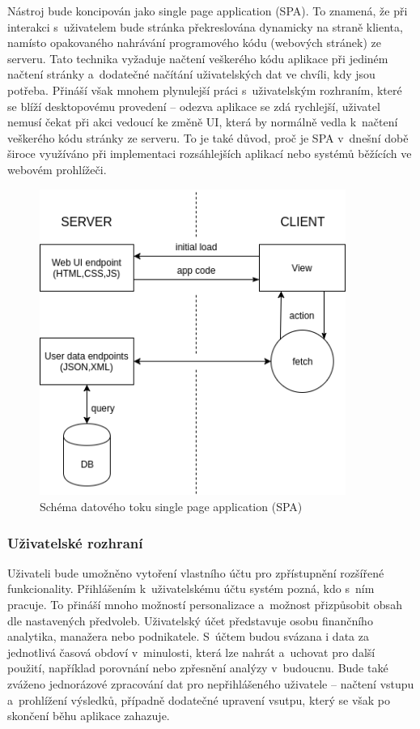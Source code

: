 Nástroj bude koncipován jako single page application (SPA). To znamená, že při interakci s~uživatelem bude stránka překreslována dynamicky na straně klienta, namísto opakovaného nahrávání programového kódu (webových stránek) ze serveru. Tato technika vyžaduje načtení veškerého kódu aplikace při jediném načtení stránky a~dodatečné načítání uživatelských dat ve chvíli, kdy jsou potřeba. Přináší však mnohem plynulejší práci s~uživatelským rozhraním, které se blíží desktopovému provedení -- odezva aplikace se zdá rychlejší, uživatel nemusí čekat při akci vedoucí ke změně UI, která by normálně vedla k~načtení veškerého kódu stránky ze serveru. To je také důvod, proč je SPA v~dnešní době široce využíváno při implementaci rozsáhlejších aplikací nebo systémů běžících ve webovém prohlížeči. 


\begin{figure}
  \centering
  \includegraphics[width=10cm]{img/spa.png}
  \caption{Schéma datového toku single page application (SPA)}
\end{figure}

\pagebreak
\subsubsection{Uživatelské rozhraní}


Uživateli bude umožněno vytoření vlastního účtu pro zpřístupnění rozšířené funkcionality. Přihlášením k~uživatelskému účtu systém pozná, kdo s~ním pracuje. To přináší mnoho možností personalizace a~možnost přizpůsobit obsah dle nastavených předvoleb. Uživatelský účet představuje osobu finančního analytika, manažera nebo podnikatele. S~účtem budou svázana i data za jednotlivá časová obdoví v~minulosti, která lze nahrát a~uchovat pro další použití, například porovnání nebo zpřesnění analýzy v~budoucnu. Bude také zváženo jednorázové zpracování dat pro nepřihlášeného uživatele -- načtení vstupu a~prohlížení výsledků, případně dodatečné upravení vsutpu, který se však po skončení běhu aplikace zahazuje.

